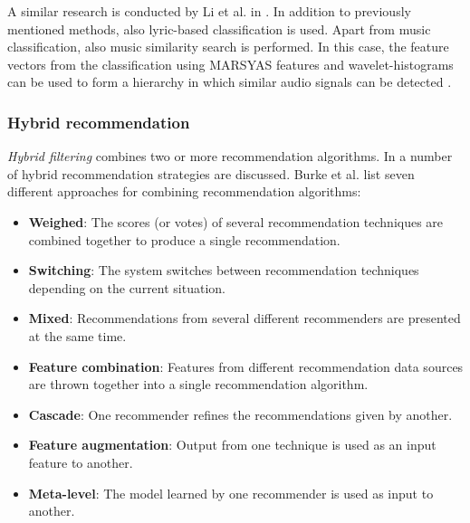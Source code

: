 A similar research is conducted by Li et al. in \cite{Li:2006:TIM:2219090.2219562}. In addition to previously mentioned methods, also lyric-based classification is used. Apart from music classification, also music similarity search is performed. In this case, the feature vectors from the classification using MARSYAS features and wavelet-histograms can be used to form a hierarchy in which similar audio signals can be detected \cite{Li:2006:TIM:2219090.2219562}.




\subsubsection{Hybrid recommendation}\label{chapter:literature_study:section:computer:subsection:algorithms:subsubsection:hf}

\emph{Hybrid filtering} combines two or more recommendation algorithms\cite{burke:2002}. In \cite{burke:2002} a number of hybrid recommendation strategies are discussed. Burke et al. list seven different approaches for combining recommendation algorithms:

\begin{itemize}
	\item \textbf{Weighed}: The scores (or votes) of several recommendation techniques are combined together to produce a single recommendation.
	\item \textbf{Switching}: The system switches between recommendation techniques depending on the current situation.
	\item \textbf{Mixed}: Recommendations from several different recommenders are presented at the same time.
	\item \textbf{Feature combination}: Features from different recommendation data sources are thrown together into a single recommendation algorithm.
	\item \textbf{Cascade}: One recommender refines the recommendations given by another.
	\item \textbf{Feature augmentation}: Output from one technique is used as an input feature to another.
	\item \textbf{Meta-level}: The model learned by one recommender is used as input to another.
\end{itemize}

